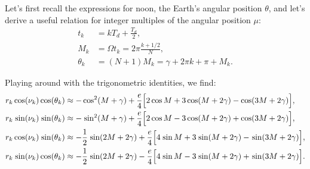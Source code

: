 \documentclass[12pt]{article}
\newcommand{\Sin}{%
  \mathop{\sbox0{$\cos$}\makebox[\wd0][r]{$\sin$}}%
}
\newcommand{\SinQ}{%
  \mathop{\sbox0{$\cos^2$}\makebox[\wd0][r]{$\sin^2$}}%
}
\begin{document}
Let's first recall the expressions for noon, the Earth's angular position 
$\theta$, and let's derive a useful relation for integer multiples of the 
angular position $\mu$:
\begin{align}
    t_k &= k T_d + \tfrac{T_d}{2},\\
    M_k &= \Omega t_k = 2\pi \tfrac{k+1/2}{N},\\
    \theta_k &= (N+1)M_k = \gamma + 2\pi k + \pi + M_k \label{eq:theta_ellipse}.
\end{align}

Playing around with the trigonometric identities, we find:
{\small
\begin{align}
    r_k \cos (\nu_k) \cos (\theta_k) &\approx 
        -\cos^2(M+\gamma)
        + \frac{e}{4} \Big[
            2\cos M + 3\cos(M+2\gamma) - \cos(3M+2\gamma)
        \Big],
        \label{eq:coscos}\\
    r_k \Sin (\nu_k) \Sin(\theta_k) &\approx 
        -\SinQ(M+\gamma)
        + \frac{e}{4} \Big[
            2\cos M - 3\cos(M+2\gamma) + \cos(3M+2\gamma)
        \Big],
        \label{eq:sinsin}\\
    r_k \cos (\nu_k) \Sin (\theta_k) &\approx 
        -\frac{1}{2}\Sin(2M+2\gamma)
        + \frac{e}{4} \Big[
            4\Sin M + 3\Sin(M+2\gamma) - \Sin(3M+2\gamma)
        \Big],
        \label{eq:cossin}\\
    r_k \Sin (\nu_k) \cos (\theta_k) &\approx 
        -\frac{1}{2}\Sin(2M+2\gamma)
        - \frac{e}{4} \Big[
            4\Sin M - 3\Sin(M+2\gamma) + \Sin(3M+2\gamma)
        \Big].
        \label{eq:sincos}
\end{align}
}
\end{document}
